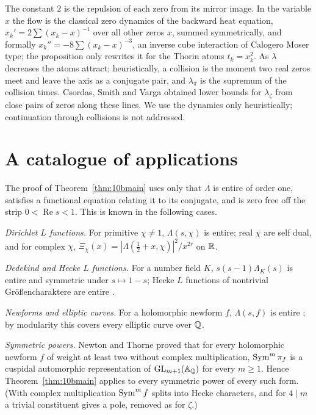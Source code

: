 The constant $2$ is the repulsion of each zero from its mirror image. In the variable $x$ the flow is the classical zero dynamics of the backward heat equation, $x_k' = 2\sum(x_k-x)^{-1}$ over all other zeros $x$, summed symmetrically, and formally $x_k'' = -8\sum(x_k-x)^{-3}$, an inverse cube interaction of Calogero Moser type; the proposition only rewrites it for the Thorin atoms $t_k = x_k^2$. As $\lambda$ decreases the atoms attract; heuristically, a collision is the moment two real zeros meet and leave the axis as a conjugate pair, and $\lambda_\pi$ is the supremum of the collision times. Csordas, Smith and Varga \cite{csordassmithvarga1994} obtained lower bounds for $\lambda_\zeta$ from close pairs of zeros along these lines. We use the dynamics only heuristically; continuation through collisions is not addressed.

\section{A catalogue of applications}

The proof of Theorem~\ref{thm:10bmain} uses only that $\Lambda$ is entire of order one, satisfies a functional equation relating it to its conjugate, and is zero free off the strip $0<\operatorname{Re}s<1$. This is known in the following cases.

\emph{Dirichlet $L$ functions.} For primitive $\chi\ne1$, $\Lambda(s,\chi)$ is entire; real $\chi$ are self dual, and for complex $\chi$, $\Xi_\chi(x) = |\Lambda(\frac12+x,\chi)|^2/x^{2r}$ on $\mathbb{R}$.

\emph{Dedekind and Hecke $L$ functions.} For a number field $K$, $s(s-1)\Lambda_K(s)$ is entire and symmetric under $s\mapsto1-s$; Hecke $L$ functions of nontrivial Gr\"o{\ss}encharaktere are entire \cite{hecke1918,tate1967}.

\emph{Newforms and elliptic curves.} For a holomorphic newform $f$, $\Lambda(s,f)$ is entire \cite{hecke1937,atkinlehner1970}; by modularity \cite{wiles1995,taylorwiles1995,bcdt2001} this covers every elliptic curve over $\mathbb{Q}$.

\emph{Symmetric powers.} Newton and Thorne \cite{newtonthorne2021,newtonthorne2021b} proved that for every holomorphic newform $f$ of weight at least two without complex multiplication, $\operatorname{Sym}^m\pi_f$ is a cuspidal automorphic representation of $\mathrm{GL}_{m+1}(\mathbb{A}_{\mathbb{Q}})$ for every $m\ge1$. Hence Theorem~\ref{thm:10bmain} applies to every symmetric power of every such form. (With complex multiplication $\operatorname{Sym}^mf$ splits into Hecke characters, and for $4\mid m$ a trivial constituent gives a pole, removed as for $\zeta$.)

